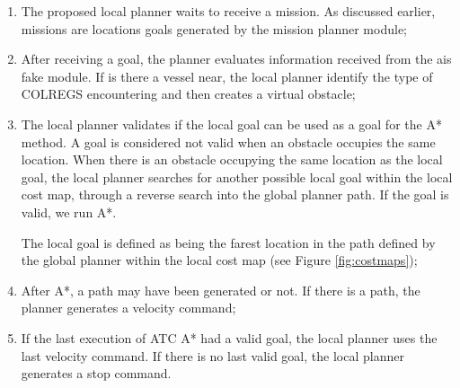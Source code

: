             \begin{enumerate}
            
                \item The proposed local planner waits to receive a mission. As discussed earlier, missions are locations goals generated by the mission planner module;
                
                \item After receiving a goal, the planner evaluates information received from the ais fake module. If is there a vessel near, the local planner identify the type of COLREGS encountering and then creates a virtual obstacle;
                
                \item The local planner validates if the local goal can be used as a goal for the A* method. A goal is considered not valid when an obstacle occupies the same location. When there is an obstacle occupying the same location as the local goal, the local planner searches for another possible local goal within the local cost map, through a reverse search into the global planner path. If the goal is valid, we run A*.
                
                The local goal is defined as being the farest location in the path defined by the global planner within the local cost map (see Figure \ref{fig:costmaps});
                
                \item After A*, a path may have been generated or not. If there is a path, the planner generates a velocity command;
                
                \item If the last execution of \ac{ATC} A* had a valid goal, the local planner uses the last velocity command. If there is no last valid goal, the local planner generates a stop command.

            \end{enumerate}
        
